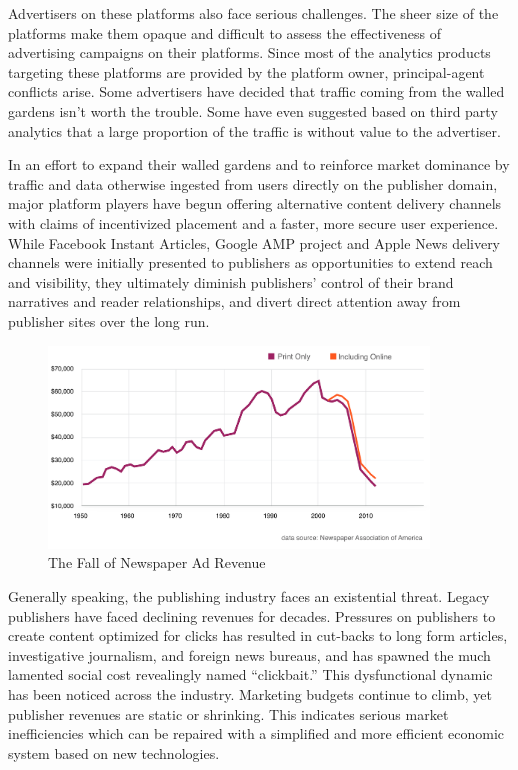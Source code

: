 \documentclass[11pt]{article}
\begin{document}
Advertisers on these platforms also face serious challenges. The sheer size of the platforms make them opaque and difficult to assess the effectiveness of advertising campaigns on their platforms. Since most of the analytics products targeting these platforms are provided by the platform owner, principal-agent conflicts arise. Some advertisers have decided that traffic coming from the walled gardens isn't worth the trouble. Some have even suggested based on third party analytics that a large proportion of the traffic is without value to the advertiser\cite{WithoutValue}.

In an effort to expand their walled gardens and to reinforce market dominance by traffic and data otherwise ingested from users directly on the publisher domain, major platform players have begun offering alternative content delivery channels with claims of incentivized placement and a faster, more secure user experience. While Facebook Instant Articles, Google AMP project and Apple News delivery channels were initially presented to publishers as opportunities to extend reach and visibility, they ultimately diminish publishers' control of their brand narratives and reader relationships, and divert direct attention away from publisher sites over the long run.


\begin{figure}
\begin{center}
\includegraphics[width=0.9\textwidth]{newspaperadrev.png}
\caption{The Fall of Newspaper Ad Revenue}
\end{center}
\end{figure}


Generally speaking, the publishing industry faces an existential threat. Legacy publishers have faced declining revenues for decades. Pressures on publishers to create content optimized for clicks has resulted in cut-backs to long form articles, investigative journalism, and foreign news bureaus, and has spawned the much lamented social cost revealingly named ``clickbait.''
This dysfunctional dynamic has been noticed across the industry. Marketing budgets continue to climb\cite{Gartner1}, yet publisher revenues are static or shrinking\cite{Econsul}. This indicates serious market inefficiencies which can be repaired with a simplified and more efficient economic system based on new technologies.
\end{document}
